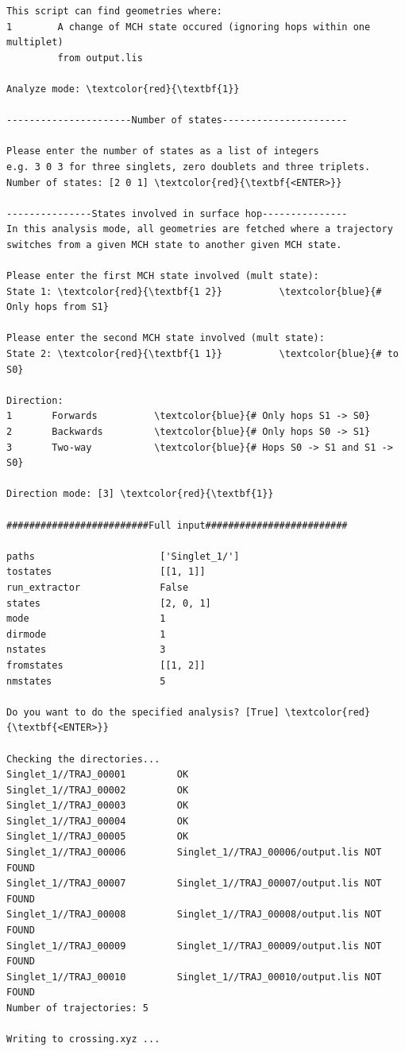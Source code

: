 \documentclass[a4paper,11pt,DIV=15,openany]{scrbook}
\begin{document}
\begin{oframed}
\begin{Verbatim}[commandchars=\\\{\}]
This script can find geometries where:
1        A change of MCH state occured (ignoring hops within one multiplet)
         from output.lis

Analyze mode: \textcolor{red}{\textbf{1}}

----------------------Number of states----------------------

Please enter the number of states as a list of integers
e.g. 3 0 3 for three singlets, zero doublets and three triplets.
Number of states: [2 0 1] \textcolor{red}{\textbf{<ENTER>}}

---------------States involved in surface hop---------------
In this analysis mode, all geometries are fetched where a trajectory 
switches from a given MCH state to another given MCH state.

Please enter the first MCH state involved (mult state):
State 1: \textcolor{red}{\textbf{1 2}}          \textcolor{blue}{# Only hops from S1}

Please enter the second MCH state involved (mult state):
State 2: \textcolor{red}{\textbf{1 1}}          \textcolor{blue}{# to S0}

Direction:
1       Forwards          \textcolor{blue}{# Only hops S1 -> S0}
2       Backwards         \textcolor{blue}{# Only hops S0 -> S1}
3       Two-way           \textcolor{blue}{# Hops S0 -> S1 and S1 -> S0}

Direction mode: [3] \textcolor{red}{\textbf{1}}

#########################Full input#########################

paths                      ['Singlet_1/']
tostates                   [[1, 1]]
run_extractor              False
states                     [2, 0, 1]
mode                       1
dirmode                    1
nstates                    3
fromstates                 [[1, 2]]
nmstates                   5

Do you want to do the specified analysis? [True] \textcolor{red}{\textbf{<ENTER>}}

Checking the directories...
Singlet_1//TRAJ_00001         OK
Singlet_1//TRAJ_00002         OK
Singlet_1//TRAJ_00003         OK
Singlet_1//TRAJ_00004         OK
Singlet_1//TRAJ_00005         OK
Singlet_1//TRAJ_00006         Singlet_1//TRAJ_00006/output.lis NOT FOUND
Singlet_1//TRAJ_00007         Singlet_1//TRAJ_00007/output.lis NOT FOUND
Singlet_1//TRAJ_00008         Singlet_1//TRAJ_00008/output.lis NOT FOUND
Singlet_1//TRAJ_00009         Singlet_1//TRAJ_00009/output.lis NOT FOUND
Singlet_1//TRAJ_00010         Singlet_1//TRAJ_00010/output.lis NOT FOUND
Number of trajectories: 5

Writing to crossing.xyz ...
\end{Verbatim}
\end{oframed}
\end{document}
